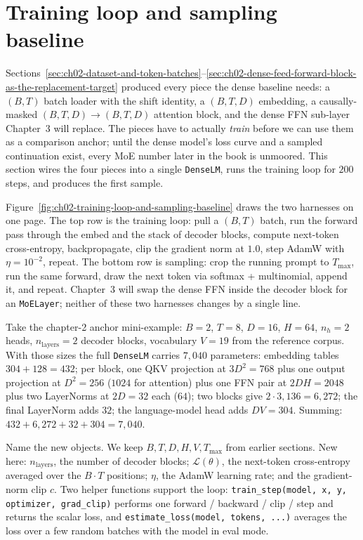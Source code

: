 \section{Training loop and sampling baseline}
\label{sec:ch02-training-loop-and-sampling-baseline}

Sections~\ref{sec:ch02-dataset-and-token-batches}--\ref{sec:ch02-dense-feed-forward-block-as-the-replacement-target} produced every piece the dense baseline needs: a $(B, T)$ batch loader with the shift identity, a $(B, T, D)$ embedding, a causally-masked $(B, T, D) \to (B, T, D)$ attention block, and the dense FFN sub-layer Chapter~3 will replace. The pieces have to actually \emph{train} before we can use them as a comparison anchor; until the dense model's loss curve and a sampled continuation exist, every MoE number later in the book is unmoored. This section wires the four pieces into a single \texttt{DenseLM}, runs the training loop for $200$ steps, and produces the first sample.



Figure~\ref{fig:ch02-training-loop-and-sampling-baseline} draws the two harnesses on one page. The top row is the training loop: pull a $(B, T)$ batch, run the forward pass through the embed and the stack of decoder blocks, compute next-token cross-entropy, backpropagate, clip the gradient norm at $1.0$, step AdamW with $\eta = 10^{-2}$, repeat. The bottom row is sampling: crop the running prompt to $T_{\max}$, run the same forward, draw the next token via softmax + multinomial, append it, and repeat. Chapter~3 will swap the dense FFN inside the decoder block for an \texttt{MoELayer}; neither of these two harnesses changes by a single line.

Take the chapter-2 anchor mini-example: $B = 2$, $T = 8$, $D = 16$, $H = 64$, $n_h = 2$ heads, $n_{\text{layers}} = 2$ decoder blocks, vocabulary $V = 19$ from the reference corpus. With those sizes the full \texttt{DenseLM} carries $7{,}040$ parameters: embedding tables $304 + 128 = 432$; per block, one QKV projection at $3 D^2 = 768$ plus one output projection at $D^2 = 256$ ($1024$ for attention) plus one FFN pair at $2 D H = 2048$ plus two LayerNorms at $2 D = 32$ each ($64$); two blocks give $2 \cdot 3{,}136 = 6{,}272$; the final LayerNorm adds $32$; the language-model head adds $D V = 304$. Summing: $432 + 6{,}272 + 32 + 304 = 7{,}040$.

Name the new objects. We keep $B, T, D, H, V, T_{\max}$ from earlier sections. New here: $n_{\text{layers}}$, the number of decoder blocks; $\mathcal{L}(\theta)$, the next-token cross-entropy averaged over the $B \cdot T$ positions; $\eta$, the AdamW learning rate; and the gradient-norm clip $c$. Two helper functions support the loop: \texttt{train\_step(model, x, y, optimizer, grad\_clip)} performs one forward / backward / clip / step and returns the scalar loss, and \texttt{estimate\_loss(model, tokens, ...)} averages the loss over a few random batches with the model in eval mode.

